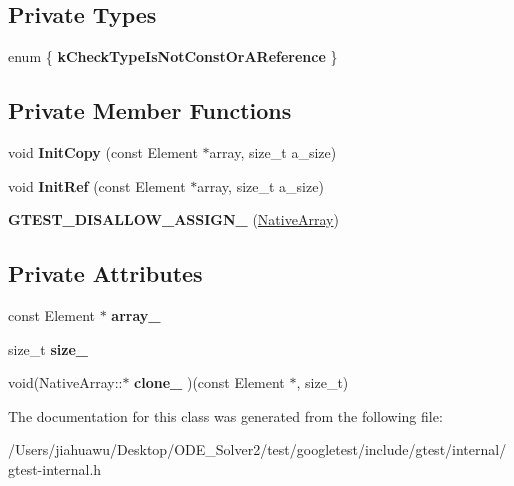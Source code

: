 \subsection*{Private Types}
\begin{DoxyCompactItemize}
\item 
\mbox{\label{classtesting_1_1internal_1_1_native_array_abe36a7e1b487dc6b9bd81489b1c2af28}} 
enum \{ {\bfseries k\+Check\+Type\+Is\+Not\+Const\+Or\+A\+Reference}
 \}
\end{DoxyCompactItemize}
\subsection*{Private Member Functions}
\begin{DoxyCompactItemize}
\item 
\mbox{\label{classtesting_1_1internal_1_1_native_array_a8c0069cc09f559785fe4923fc118056f}} 
void {\bfseries Init\+Copy} (const Element $\ast$array, size\+\_\+t a\+\_\+size)
\item 
\mbox{\label{classtesting_1_1internal_1_1_native_array_ac6ad6d79e17e2c98a9d4d684afcb7f79}} 
void {\bfseries Init\+Ref} (const Element $\ast$array, size\+\_\+t a\+\_\+size)
\item 
\mbox{\label{classtesting_1_1internal_1_1_native_array_a6633f3eab6947d4502fb1c69f95be66e}} 
{\bfseries G\+T\+E\+S\+T\+\_\+\+D\+I\+S\+A\+L\+L\+O\+W\+\_\+\+A\+S\+S\+I\+G\+N\+\_\+} (\mbox{\hyperlink{classtesting_1_1internal_1_1_native_array}{Native\+Array}})
\end{DoxyCompactItemize}
\subsection*{Private Attributes}
\begin{DoxyCompactItemize}
\item 
\mbox{\label{classtesting_1_1internal_1_1_native_array_adadc025fbbbd43904d4036991019f18f}} 
const Element $\ast$ {\bfseries array\+\_\+}
\item 
\mbox{\label{classtesting_1_1internal_1_1_native_array_aa7e4251de39aaa75f697f0eaeedbf06e}} 
size\+\_\+t {\bfseries size\+\_\+}
\item 
\mbox{\label{classtesting_1_1internal_1_1_native_array_addd7442a10398a60215a9989bcbd8078}} 
void(Native\+Array\+::$\ast$ {\bfseries clone\+\_\+} )(const Element $\ast$, size\+\_\+t)
\end{DoxyCompactItemize}


The documentation for this class was generated from the following file\+:\begin{DoxyCompactItemize}
\item 
/\+Users/jiahuawu/\+Desktop/\+O\+D\+E\+\_\+\+Solver2/test/googletest/include/gtest/internal/gtest-\/internal.\+h\end{DoxyCompactItemize}

